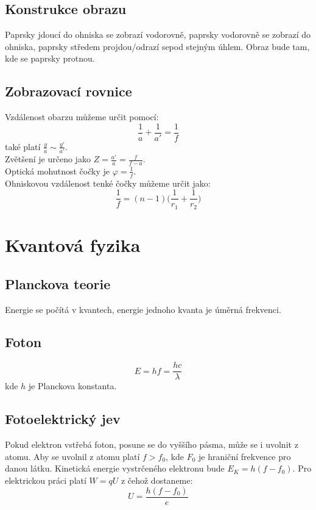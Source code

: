 \documentclass[titlepage]{report}
\begin{document}
\section{Konstrukce obrazu}
Paprsky jdoucí do ohniska se zobrazí vodorovně, paprsky vodorovně se zobrazí do ohniska, paprsky středem projdou/odrazí sepod stejným úhlem. Obraz bude tam, kde se paprsky protnou.
\section{Zobrazovací rovnice}
Vzdálenost obarzu můžeme určit pomocí:\\
\begin{equation}
\frac{1}{a} + \frac{1}{a'} = \frac{1}{f}
\end{equation}
také platí $\frac{y}{a} \sim \frac{y'}{a'}$.\\
Zvětšení je určeno jako $Z = \frac{a'}{a} = \frac{f}{f-a}$.\\
Optická mohutnost čočky je $\varphi = \frac{1}{f}$.\\
Ohniskovou vzdálenost tenké čočky můžeme určit jako:\\
\begin{equation}
\frac{1}{f} = (n - 1) \Big ( \frac{1}{r_1} + \frac{1}{r_2} \Big )
\end{equation}
\chapter{Kvantová fyzika}
\section{Planckova teorie}
Energie se počítá v kvantech, energie jednoho kvanta je úměrná frekvenci.
\section{Foton}
\begin{equation}
E = hf =\frac{hc}{\lambda}
\end{equation}
kde $h$ je Planckova konstanta.
\section{Fotoelektrický jev}
Pokud elektron vstřebá foton, posune se do vyššího pásma, může se i uvolnit z atomu. Aby se uvolnil z atomu platí $f > f_0$, kde $F_0$ je hraniční frekvence pro danou látku. Kinetická energie vystrčeného elektronu bude $E_K = h(f - f_0)$. Pro elektrickou práci platí $W = qU$ z čehož dostaneme:\\
\begin{equation}
U = \frac{h(f-f_0)}{e}
\end{equation}
\end{document}
